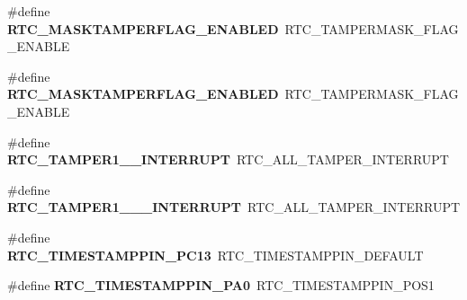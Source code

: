 \begin{DoxyCompactItemize}
\item 
\#define {\bfseries R\+T\+C\+\_\+\+M\+A\+S\+K\+T\+A\+M\+P\+E\+R\+F\+L\+A\+G\+\_\+\+E\+N\+A\+B\+L\+ED}~R\+T\+C\+\_\+\+T\+A\+M\+P\+E\+R\+M\+A\+S\+K\+\_\+\+F\+L\+A\+G\+\_\+\+E\+N\+A\+B\+LE\hypertarget{group___h_a_l___r_t_c___aliased___defines_gab9424e57ef6067b1d7f5030ee45192d5}{}\label{group___h_a_l___r_t_c___aliased___defines_gab9424e57ef6067b1d7f5030ee45192d5}

\item 
\#define {\bfseries R\+T\+C\+\_\+\+M\+A\+S\+K\+T\+A\+M\+P\+E\+R\+F\+L\+A\+G\+\_\+\+E\+N\+A\+B\+L\+ED}~R\+T\+C\+\_\+\+T\+A\+M\+P\+E\+R\+M\+A\+S\+K\+\_\+\+F\+L\+A\+G\+\_\+\+E\+N\+A\+B\+LE\hypertarget{group___h_a_l___r_t_c___aliased___defines_gab9424e57ef6067b1d7f5030ee45192d5}{}\label{group___h_a_l___r_t_c___aliased___defines_gab9424e57ef6067b1d7f5030ee45192d5}

\item 
\#define {\bfseries R\+T\+C\+\_\+\+T\+A\+M\+P\+E\+R1\+\_\+\_\+\+I\+N\+T\+E\+R\+R\+U\+PT}~R\+T\+C\+\_\+\+A\+L\+L\+\_\+\+T\+A\+M\+P\+E\+R\+\_\+\+I\+N\+T\+E\+R\+R\+U\+PT\hypertarget{group___h_a_l___r_t_c___aliased___defines_gad52c576aeb40eeeed3274e6a8c5cf83a}{}\label{group___h_a_l___r_t_c___aliased___defines_gad52c576aeb40eeeed3274e6a8c5cf83a}

\item 
\#define {\bfseries R\+T\+C\+\_\+\+T\+A\+M\+P\+E\+R1\+\_\+\_\+\_\+\+I\+N\+T\+E\+R\+R\+U\+PT}~R\+T\+C\+\_\+\+A\+L\+L\+\_\+\+T\+A\+M\+P\+E\+R\+\_\+\+I\+N\+T\+E\+R\+R\+U\+PT\hypertarget{group___h_a_l___r_t_c___aliased___defines_ga30a97d2cbfeca6b663b9f116e13c511a}{}\label{group___h_a_l___r_t_c___aliased___defines_ga30a97d2cbfeca6b663b9f116e13c511a}

\item 
\#define {\bfseries R\+T\+C\+\_\+\+T\+I\+M\+E\+S\+T\+A\+M\+P\+P\+I\+N\+\_\+\+P\+C13}~R\+T\+C\+\_\+\+T\+I\+M\+E\+S\+T\+A\+M\+P\+P\+I\+N\+\_\+\+D\+E\+F\+A\+U\+LT\hypertarget{group___h_a_l___r_t_c___aliased___defines_ga86b6c9d9b06b1ab23722bf02799adfca}{}\label{group___h_a_l___r_t_c___aliased___defines_ga86b6c9d9b06b1ab23722bf02799adfca}

\item 
\#define {\bfseries R\+T\+C\+\_\+\+T\+I\+M\+E\+S\+T\+A\+M\+P\+P\+I\+N\+\_\+\+P\+A0}~R\+T\+C\+\_\+\+T\+I\+M\+E\+S\+T\+A\+M\+P\+P\+I\+N\+\_\+\+P\+O\+S1\hypertarget{group___h_a_l___r_t_c___aliased___defines_ga8d806818f1fcdaf744042a19563a8052}{}\label{group___h_a_l___r_t_c___aliased___defines_ga8d806818f1fcdaf744042a19563a8052}


\end{DoxyCompactItemize}
